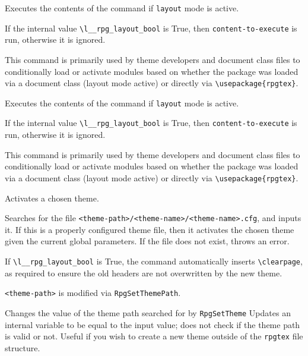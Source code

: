 		\begin{macrolist}
				{\label{Macro:DiceFormat}
					Executes the contents of the command if \verb|layout| mode is active.
				}
				{
				}
				{
					If the internal value \texttt{\textbackslash{}l\_\_rpg\_layout\_bool} is True, then \verb|content-to-execute| is run, otherwise it is ignored.

					This command is primarily used by theme developers and document class files to conditionally load or activate modules based on whether the package was loaded via a document class (layout mode active) or directly via \verb|\usepackage{rpgtex}|.
				}
				{
					Executes the contents of the command if \verb|layout| mode is active.
				}
				{
				}
				{
					If the internal value \texttt{\textbackslash{}l\_\_rpg\_layout\_bool} is True, then \verb|content-to-execute| is run, otherwise it is ignored.

					This command is primarily used by theme developers and document class files to conditionally load or activate modules based on whether the package was loaded via a document class (layout mode active) or directly via \verb|\usepackage{rpgtex}|.
				}
				{
					Activates a chosen theme.
				}
				{
				}
				{
					Searches for the file \verb|<theme-path>/<theme-name>/<theme-name>.cfg|, and inputs it. If this is a properly configured theme file, then it activates the chosen theme given the current global parameters. If the file does not exist, throws an error.

					If   \texttt{\textbackslash{}l\_\_rpg\_layout\_bool} is True, the command automatically inserts \verb|\clearpage|, as required to ensure the old headers are not overwritten by the new theme.

					\verb|<theme-path>| is modified via \verb|RpgSetThemePath|.
				}

				{
					Changes the value of the theme path searched for by \verb|RpgSetTheme|
				}
				{
				}
				{
					Updates an internal variable to be equal to the input value; does not check if the theme path is valid or not. Useful if you wish to create a new theme outside of the \verb|rpgtex| file structure.
				}
		\end{macrolist}
